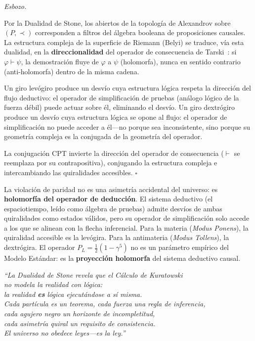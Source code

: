 \documentclass[11pt, a4paper, openany]{book}
\renewenvironment{proof}[1][Demostraci\'on]{%
  \par\noindent\textit{#1.}\quad
}{\hfill$\square$\par\medskip}
\begin{document}
\begin{proof}[Esbozo]
Por la Dualidad de Stone, los abiertos de la topolog\'ia de
Alexandrov sobre $(P, \prec)$ corresponden a filtros del \'algebra
booleana de proposiciones causales. La estructura compleja de la
superficie de Riemann (Belyi) se traduce, v\'ia esta dualidad,
en la \textbf{direccionalidad} del operador de consecuencia
de Tarski~\cite{tarski1930}: si $\varphi \vdash \psi$, la
demostraci\'on fluye de $\varphi$ a $\psi$ (holomorfa), nunca en
sentido contrario (anti-holomorfa) dentro de la misma cadena.

Un giro lev\'ogiro produce un desv\'io cuya estructura l\'ogica
respeta la direcci\'on del flujo deductivo: el operador de
simplificaci\'on de pruebas (an\'alogo l\'ogico de la fuerza d\'ebil)
puede actuar sobre \'el, eliminando el desv\'io. Un giro dextr\'ogiro
produce un desv\'io cuya estructura l\'ogica se opone al flujo:
el operador de simplificaci\'on no puede acceder a \'el---no porque
sea inconsistente, sino porque su geometr\'ia compleja es la conjugada
de la geometr\'ia del operador.

La conjugaci\'on CPT invierte la direcci\'on del operador de
consecuencia ($\vdash$ se reemplaza por su contrapositiva), conjugando
la estructura compleja e intercambiando las quiralidades accesibles.
\end{proof}

\begin{result}[title={La Violaci\'on de Paridad es Consistencia Holomorfa}]
\label{res:stone-parity}
La violaci\'on de paridad no es una asimetr\'ia accidental del
universo: es \textbf{holomorf\'ia del operador de deducci\'on}. El
sistema deductivo (el espaciotiempo, le\'ido como \'algebra de pruebas)
admite desv\'ios de ambas quiralidades como estados v\'alidos, pero su
operador de simplificaci\'on solo accede a los que se alinean con la
flecha inferencial. Para la materia (\emph{Modus Ponens}), la
quiralidad accesible es la lev\'ogira. Para la antimateria (\emph{Modus
Tollens}), la dextr\'ogira. El operador $P_L = \tfrac{1}{2}(1-\gamma^5)$
no es un par\'ametro emp\'irico del Modelo Est\'andar: es la
\textbf{proyecci\'on holomorfa} del sistema deductivo causal.
\end{result}

\bigskip
\begin{center}
\large\itshape\color{structure}
``La Dualidad de Stone revela que el C\'alculo de Kuratowski\\
no \emph{modela} la realidad con l\'ogica:\\
la realidad \textbf{es} l\'ogica ejecut\'andose a s\'i misma.\\
Cada part\'icula es un teorema, cada fuerza una regla de inferencia,\\
cada agujero negro un horizonte de incompletitud,\\
cada asimetr\'ia quiral un requisito de consistencia.\\
El universo no obedece leyes---\emph{es} la ley.''
\end{center}

\backmatter
{}

\end{document}

